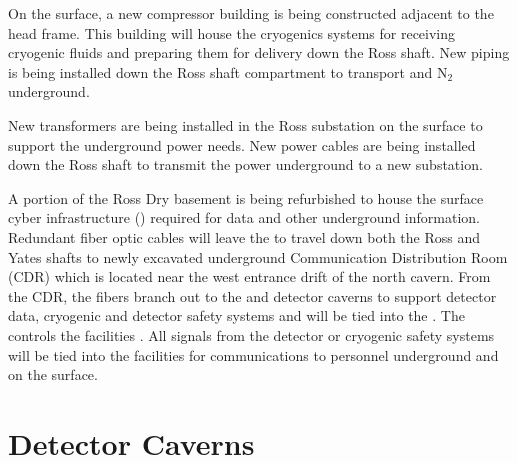 On the surface, a new compressor building is being constructed
adjacent to the head frame.  This building will house the cryogenics
systems for receiving cryogenic fluids and preparing them for delivery
down the Ross shaft.  New piping is being installed down the Ross
shaft compartment to transport  and N$_2$ underground.

New transformers are being installed in the Ross substation on the
surface to support the underground power needs.  New power cables are
being installed down the Ross shaft to transmit the power underground
to a new substation.

A portion of the Ross Dry basement is being refurbished to house the
surface cyber infrastructure () required for data and other
underground information.  Redundant fiber optic cables will leave the
 to travel down both the Ross and Yates shafts to newly
excavated underground Communication Distribution Room (CDR) which is
located near the west entrance drift of the north cavern.  From the
CDR, the fibers branch out to the  and detector caverns to
support detector data, cryogenic and detector safety systems and will
be tied into the .  The  controls the facilities
.  All  signals from the detector or cryogenic
safety systems will be tied into the facilities  for
communications to personnel underground and on the surface.

\section{Detector Caverns}
\label{sec:fdsp-coord-faci-caverns}


